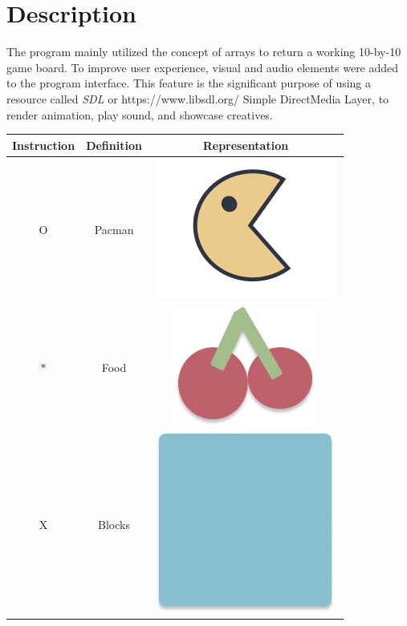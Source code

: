 
\section{Description}

The program mainly utilized the concept of arrays to return a working 10-by-10
game board. To improve user experience, visual and audio elements were added to
the program interface. This feature is the significant purpose of using a
resource called \emph{SDL} or https://www.libsdl.org/  Simple DirectMedia Layer,
to render animation, play sound, and showcase creatives.

\begin{table}[H]
    \centering
    \def\arraystretch{2.5}
    \begin{tabular}{ c c c }
        \hline
        Instruction & Definition & Representation \\
        \hline
        O & Pacman & \includegraphics[scale=0.1]{assets/pacman_sample.png} \\
        $*$ & Food & \includegraphics[scale=0.1]{assets/food_sample.png} \\
        X & Blocks & \includegraphics[scale=0.1]{assets/block_sample.png} \\

\end{tabular}
\end{table}
